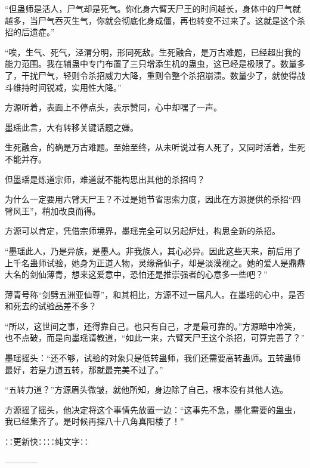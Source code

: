 \begin{this_body}
“但蛊师是活人，尸气却是死气。你化身六臂天尸王的时间越长，身体中的尸气就越多，当尸气吞灭生气，你就会彻底化身成僵，再也转变不过来了。这就是这个杀招的后遗症。”

“唉，生气、死气，泾渭分明，形同死敌。生死融合，是万古难题，已经超出我的能力范围。我在辅蛊中专门布置了三只增添生机的蛊虫，这已经是极限了。数量多了，干扰尸气，轻则令杀招威力大降，重则令整个杀招崩溃。数量少了，就使得战斗维持时间锐减，实用性大降。”

方源听着，表面上不停点头，表示赞同，心中却嘿了一声。

墨瑶此言，大有转移关键话题之嫌。

生死融合，的确是万古难题。至始至终，从未听说过有人死了，又同时活着，生死不能并存。

但墨瑶是炼道宗师，难道就不能构思出其他的杀招吗？

为什么一定要用六臂天尸王？不过是她节省思索力度，因此在方源提供的杀招“四臂风王”，稍加改良而得。

方源可以肯定，凭借宗师境界，墨瑶完全可以另起炉灶，构思全新的杀招。

“墨瑶此人，乃是异族，是墨人。非我族人，其心必异。因此这些天来，前后用了上千名蛊师试验，她身为正道人物，灵缘斋仙子，却是淡漠视之。她的爱人是鼎鼎大名的剑仙薄青，想来这爱意中，恐怕还是推崇强者的心意多一些吧？”

薄青号称“剑劈五洲亚仙尊”，和其相比，方源不过一届凡人。在墨瑶的心中，是否和死去的试验品差不多？

“所以，这世间之事，还得靠自己。也只有自己，才是最可靠的。”方源暗中冷笑，也不点破，而是向墨瑶请教道，“如此一来，六臂天尸王这个杀招，可算完善了？”

墨瑶摇头：“还不够，试验的对象只是低转蛊师，我们还需要高转蛊师。五转蛊师最好，若是力道五转，那就最完美不过了。”

“五转力道？”方源眉头微皱，就他所知，身边除了自己，根本没有其他人选。

方源摇了摇头，他决定将这个事情先放置一边：“这事先不急，墨化需要的蛊虫，我已经集齐了。是时候再探八十八角真阳楼了！”

∷更新快∷∷纯文字∷

------------

\end{this_body}

